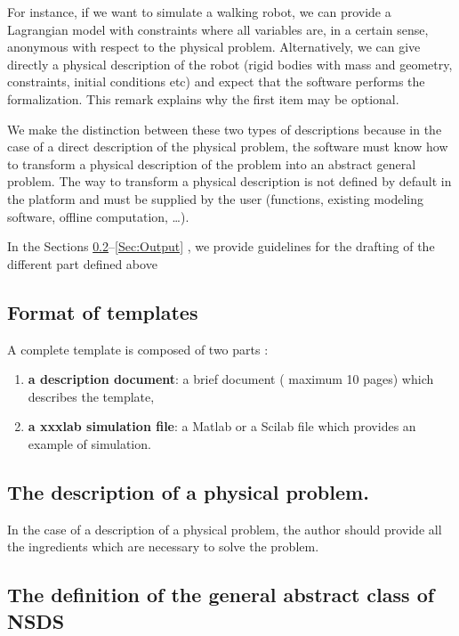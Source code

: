\documentclass[10pt]{article}
\begin{document}
\begin{remark}
  For instance, if we want to simulate a walking robot,  we can  provide a Lagrangian model with constraints where all variables are, in a certain sense, anonymous with  respect to the physical problem. Alternatively, we can give directly a physical description of the robot (rigid bodies with mass and geometry, constraints, initial conditions etc) and expect that the software performs the formalization. This remark explains why the first item may be optional.

We make the distinction between these two types of descriptions because in the case of a direct description of the physical problem, the software must know how to transform a physical description of the problem into an abstract general problem. The way to transform a physical description is not defined by default in the platform and must be supplied by the user (functions, existing modeling software, offline computation, \ldots). 

\end{remark}

In the Sections \ref{Sec:DescritionProblem}--\ref{Sec:Output} , we provide guidelines for the drafting of the different part defined above

\subsection{Format of templates}

A complete template is composed of two parts :
\begin{enumerate}
\item \textbf{a description document}: a brief document ( maximum 10 pages) which describes the template,
\item \textbf{a xxxlab simulation file}: a Matlab or a Scilab file which provides an example of simulation.
\end{enumerate}


\subsection{The description of a  physical problem.}
\label{Sec:DescritionProblem}
In the case of a description of a physical problem, the author should provide all the ingredients which are necessary to solve the problem.

\subsection{The definition of the general abstract class of NSDS}
\end{document}
